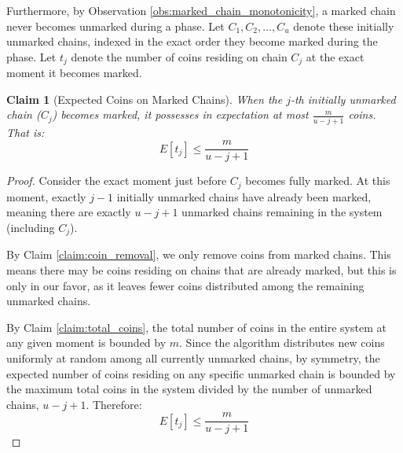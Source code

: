 \documentclass[a4paper]{article}
\newtheorem{claim}{Claim}      %
\begin{document}
Furthermore, by Observation \ref{obs:marked_chain_monotonicity}, a marked chain never becomes unmarked during a phase. Let $C_1, C_2, \ldots, C_u$ denote these initially unmarked chains, indexed in the exact order they become marked during the phase. Let $t_j$ denote the number of coins residing on chain $C_j$ at the exact moment it becomes marked.

\begin{claim}[Expected Coins on Marked Chains]
\label{claim:expected_marked}
When the $j$-th initially unmarked chain ($C_j$) becomes marked, it possesses in expectation at most $\frac{m}{u - j + 1}$ coins. That is:
$$E[t_j] \le \frac{m}{u - j + 1}$$
\end{claim}
\begin{proof}
Consider the exact moment just before $C_j$ becomes fully marked. At this moment, exactly $j - 1$ initially unmarked chains have already been marked, meaning there are exactly $u - j + 1$ unmarked chains remaining in the system (including $C_j$).

By Claim \ref{claim:coin_removal}, we only remove coins from marked chains. This means there may be coins residing on chains that are already marked, but this is only in our favor, as it leaves fewer coins distributed among the remaining unmarked chains. 

By Claim \ref{claim:total_coins}, the total number of coins in the entire system at any given moment is bounded by $m$. Since the algorithm distributes new coins uniformly at random among all currently unmarked chains, by symmetry, the expected number of coins residing on any specific unmarked chain is bounded by the maximum total coins in the system divided by the number of unmarked chains, $u - j + 1$. Therefore:
$$E[t_j] \le \frac{m}{u - j + 1}$$
\end{proof}
\end{document}
